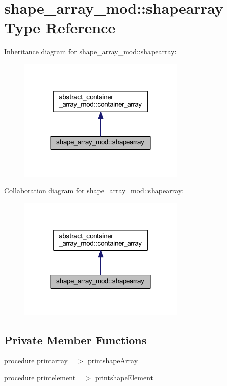 \hypertarget{structshape__array__mod_1_1shapearray}{}\section{shape\+\_\+array\+\_\+mod\+:\+:shapearray Type Reference}
\label{structshape__array__mod_1_1shapearray}


Inheritance diagram for shape\+\_\+array\+\_\+mod\+:\+:shapearray\+:
\nopagebreak
\begin{figure}[H]
\begin{center}
\leavevmode
\includegraphics[width=228pt]{structshape__array__mod_1_1shapearray__inherit__graph}
\end{center}
\end{figure}


Collaboration diagram for shape\+\_\+array\+\_\+mod\+:\+:shapearray\+:
\nopagebreak
\begin{figure}[H]
\begin{center}
\leavevmode
\includegraphics[width=228pt]{structshape__array__mod_1_1shapearray__coll__graph}
\end{center}
\end{figure}
\subsection*{Private Member Functions}
\begin{DoxyCompactItemize}
\item 
procedure \hyperlink{structshape__array__mod_1_1shapearray_a3ee5328343a8ba2b26ee4e91385d009d}{printarray} =$>$ printshape\+Array
\item 
procedure \hyperlink{structshape__array__mod_1_1shapearray_acd1aa17e088e5534c3d9373bd28a3921}{printelement} =$>$ printshape\+Element
\end{DoxyCompactItemize}


